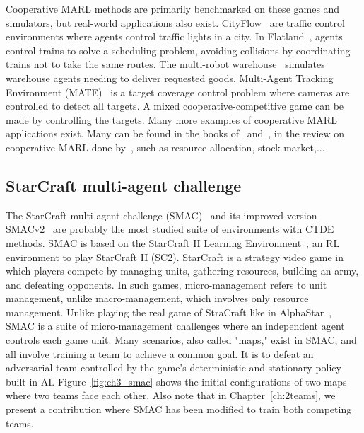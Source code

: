 Cooperative MARL methods are primarily benchmarked on these games and simulators, but real-world applications also exist.
CityFlow~\citep{zhang2019cityflow} are traffic control environments where agents control traffic lights in a city.
In Flatland~\citep{mohanty2020flatland}, agents control trains to solve a scheduling problem, avoiding collisions by coordinating trains not to take the same routes.
The multi-robot warehouse~\citep{papoudakis2021benchmarking, christianos2020shared} simulates warehouse agents needing to deliver requested goods.
Multi-Agent Tracking Environment (MATE)~\citep{NEURIPS2022_b2a1c152} is a target coverage control problem where cameras are controlled to detect all targets.
A mixed cooperative-competitive game can be made by controlling the targets.
Many more examples of cooperative MARL applications exist.
Many can be found in the books of~\cite{DecPomdp} and~\cite{marl-book}, in the review on cooperative MARL done by~\cite{oroojlooy2022review}, such as resource allocation, stock market,...


\subsection{StarCraft multi-agent challenge} \label{sec:ch3_smac}
The StarCraft multi-agent challenge (SMAC)~\citep{samvelyan2019starcraft} and its improved version SMACv2~\citep{ellis2023smacv2} are probably the most studied suite of environments with CTDE methods.
SMAC is based on the StarCraft II Learning Environment~\citep{vinyals2017starcraft}, an RL environment to play StarCraft II (SC2).
StarCraft is a strategy video game in which players compete by managing units, gathering resources, building an army, and defeating opponents.
In such games, micro-management refers to unit management, unlike macro-management, which involves only resource management.
Unlike playing the real game of StraCraft like in AlphaStar~\citep{vinyals2019grandmaster}, SMAC is a suite of micro-management challenges where an independent agent controls each game unit.
Many scenarios, also called "maps," exist in SMAC, and all involve training a team to achieve a common goal.
It is to defeat an adversarial team controlled by the game's deterministic and stationary policy built-in AI.
Figure~\ref{fig:ch3_smac} shows the initial configurations of two maps where two teams face each other.
Also note that in Chapter~\ref{ch:2teams}, we present a contribution where SMAC has been modified to train both competing teams.

